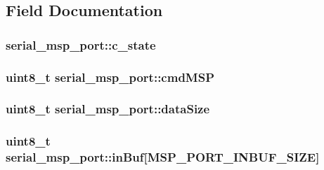 \subsection{Field Documentation}
\hypertarget{structserial__msp__port_a9a0697ac09c1bc1599ff15d82b1d6fdb}{
\subsubsection[{c\+\_\+state}]{ serial\+\_\+msp\+\_\+port\+::c\+\_\+state}}\label{structserial__msp__port_a9a0697ac09c1bc1599ff15d82b1d6fdb}
\hypertarget{structserial__msp__port_aa5d461548f8635527072a16fd685086d}{
\subsubsection[{cmd\+M\+S\+P}]{\setlength{\rightskip}{0pt plus 5cm}uint8\+\_\+t serial\+\_\+msp\+\_\+port\+::cmd\+M\+S\+P}}\label{structserial__msp__port_aa5d461548f8635527072a16fd685086d}
\hypertarget{structserial__msp__port_a7fa4bf5a91177dc106c6ed8657ef032e}{
\subsubsection[{data\+Size}]{\setlength{\rightskip}{0pt plus 5cm}uint8\+\_\+t serial\+\_\+msp\+\_\+port\+::data\+Size}}\label{structserial__msp__port_a7fa4bf5a91177dc106c6ed8657ef032e}
\hypertarget{structserial__msp__port_af4465500e579489110ca6e936b380ac4}{
\subsubsection[{in\+Buf}]{\setlength{\rightskip}{0pt plus 5cm}uint8\+\_\+t serial\+\_\+msp\+\_\+port\+::in\+Buf\mbox{[}{\bf M\+S\+P\+\_\+\+P\+O\+R\+T\+\_\+\+I\+N\+B\+U\+F\+\_\+\+S\+I\+Z\+E}\mbox{]}}}\label{structserial__msp__port_af4465500e579489110ca6e936b380ac4}
